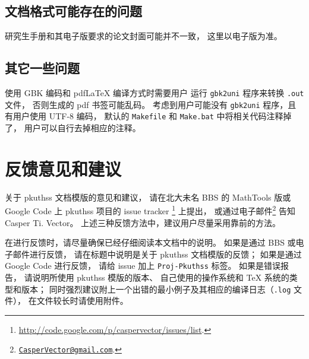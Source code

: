 		\subsection{文档格式可能存在的问题}

		研究生手册和其电子版\supercite{pku-thesisstyle}要求的论文封面可能并不一致，
		这里以电子版为准。

		\subsection{其它一些问题}

		使用 GBK 编码和 pdf\LaTeX{} 编译方式时需要用户%
		运行 \verb|gbk2uni| 程序来转换 \verb|.out| 文件，
		否则生成的 pdf 书签可能乱码。
		考虑到用户可能没有 \verb|gbk2uni| 程序，且有用户使用 UTF-8 编码，
		默认的 \verb|Makefile| 和 \verb|Make.bat| 中将相关代码注释掉了，
		用户可以自行去掉相应的注释。

	\section{反馈意见和建议}

	关于 pkuthss 文档模版的意见和建议，
	请在北大未名 BBS 的 MathTools 版或 %
	Google Code 上 pkuthss 项目的 issue tracker%
	\footnote{\url{http://code.google.com/p/caspervector/issues/list}.}%
	上提出，
	或通过电子邮件\footnote%
	{\href{mailto:CasperVector@gmail.com}{\texttt{CasperVector@gmail.com}}.}%
	告知 Casper Ti. Vector。
	上述三种反馈方法中，建议用户尽量采用靠前的方法。

	在进行反馈时，请尽量确保已经仔细阅读本文档中的说明。
	如果是通过 BBS 或电子邮件进行反馈，
	请在标题中说明是关于 pkuthss 文档模版的反馈；
	如果是通过 Google Code 进行反馈，
	请给 issue 加上 \verb|Proj-Pkuthss| 标签。
	如果是错误报告，
	请说明所使用 pkuthss 模版的版本、
	自己使用的操作系统和 \TeX{} 系统的类型和版本；
	同时强烈建议附上一个出错的最小例子及其相应的编译日志（\verb|.log| 文件），
	在文件较长时请使用附件。

